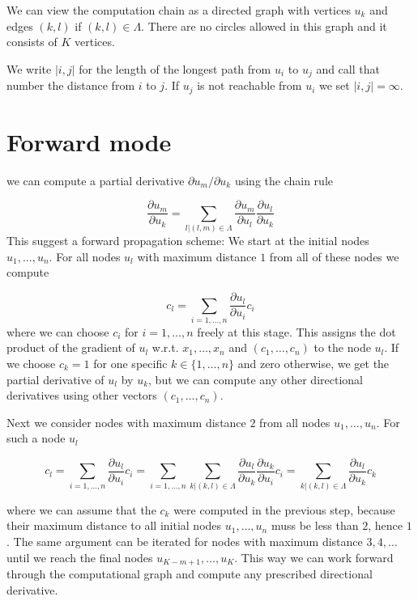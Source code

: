 \documentclass{amsart}
\theoremstyle{plain}
\numberwithin{equation}{section}
\begin{document}
We can view the computation chain as a directed graph with vertices $u_k$ and edges $(k,l)$ if $(k,l)\in\Lambda$. There are no circles allowed in this graph and it consists of $K$ vertices.

We write $|i,j|$ for the length of the longest path from $u_i$ to $u_j$ and call that number the distance from $i$ to $j$. If $u_j$ is not reachable from $u_i$ we set $|i,j| = \infty$.

\section{Forward mode}

we can compute a partial derivative $\partial u_m / \partial u_k$ using the chain rule

\begin{equation}\label{forward_u}
\frac{\partial u_m}{\partial u_k} = \sum_{l|(l,m)\in\Lambda} \frac{\partial u_m}{\partial u_l} \frac{\partial u_l}{\partial u_k}
\end{equation}
This suggest a forward propagation scheme: We start at the initial nodes $u_1, ... , u_n$. For all nodes $u_l$ with maximum distance $1$ from all of these nodes we compute

\begin{equation}
c_l = \sum_{i=1,\dots,n} \frac{\partial u_l}{\partial u_i} c_{i} 
\end{equation}
where we can choose $c_i$ for $i=1,\dots,n$ freely at this stage. This assigns the dot product of the gradient of $u_l$ w.r.t. $x_1, \dots, x_n$ and $(c_1,\dots,c_n)$ to the node $u_l$. If we choose $c_k=1$ for one specific $k\in\{1,\dots,n\}$ and zero otherwise, we get the partial derivative of $u_l$ by $u_k$, but we can compute any other directional derivatives using other vectors $(c_1,\dots,c_n)$.

Next we consider nodes with maximum distance $2$ from all nodes $u_1,\dots,u_n$. For such a node $u_l$

\begin{equation}
c_l = \sum_{i=1,\dots,n} \frac{\partial u_l}{\partial u_i} c_i = \sum_{i=1,\dots,n} \sum_{k|(k,l)\in\Lambda} \frac{\partial u_l}{\partial u_k} \frac{\partial u_k}{\partial u_i} c_i = \sum_{k|(k,l)\in\Lambda} \frac{\partial u_l}{\partial u_k} c_k
\end{equation}

where we can assume that the $c_k$ were computed in the previous step, because their maximum distance to all initial nodes $u_1,\dots,u_n$ muss be less than $2$, hence $1$. The same argument can be iterated for nodes with maximum distance $3, 4, \dots$ until we reach the final nodes $u_{K-m+1},\dots,u_K$. This way we can work forward through the computational graph and compute any prescribed directional derivative.
\end{document}
